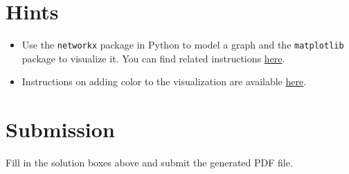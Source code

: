 \documentclass[a4paper]{exam}
\begin{document}
\section*{Hints}
\begin{itemize}
\item Use the \texttt{networkx} package in Python to model a graph and the \texttt{matplotlib} package to visualize it. You can find related instructions \href{https://www.geeksforgeeks.org/python-visualize-graphs-generated-in-networkx-using-matplotlib/}{here}.
\item Instructions on adding color to the visualization are available \href{https://stackoverflow.com/questions/27030473/how-to-set-colors-for-nodes-in-networkx}{here}.
\end{itemize}

\section*{Submission}

Fill in the solution boxes above and submit the generated PDF file.
\end{document}
